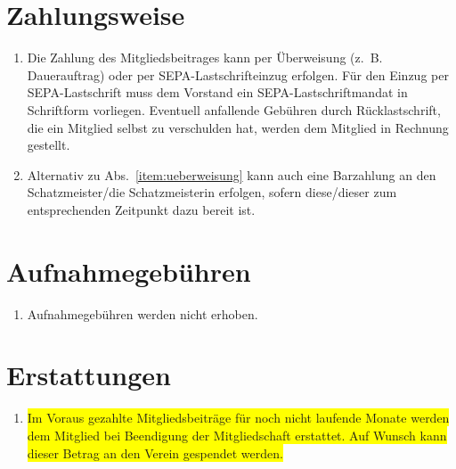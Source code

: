 \documentclass[a4paper,12pt]{scrartcl}
\begin{document}
\section{Zahlungsweise}
\begin{enumerate}
  \item\label{item:ueberweisung} Die Zahlung des Mitgliedsbeitrages kann per
    Überweisung (z.~B. Dauerauftrag) oder per SEPA-Lastschrifteinzug erfolgen.
    Für den Einzug per SEPA-Lastschrift muss dem Vorstand ein
    SEPA-Lastschriftmandat in Schriftform vorliegen. Eventuell anfallende
    Gebühren durch Rücklastschrift, die ein Mitglied selbst zu verschulden hat,
    werden dem Mitglied in Rechnung gestellt.
  \item Alternativ zu Abs.~\ref{item:ueberweisung} kann auch eine Barzahlung an
    den Schatzmeister/die Schatzmeisterin erfolgen, sofern diese/dieser zum 
    entsprechenden Zeitpunkt dazu bereit ist.
\end{enumerate}

\section{Aufnahmegebühren}
\begin{enumerate}
  \item Aufnahmegebühren werden nicht erhoben.
\end{enumerate}

\section{Erstattungen}
\begin{enumerate}
  \item \colorbox{yellow}{Im Voraus gezahlte Mitgliedsbeiträge für noch nicht 
    laufende Monate werden}\\\colorbox{yellow}{dem Mitglied bei Beendigung der
    Mitgliedschaft erstattet. Auf Wunsch kann}\\\colorbox{yellow}{dieser Betrag 
    an den Verein gespendet werden.}
\end{enumerate}
\end{document}
